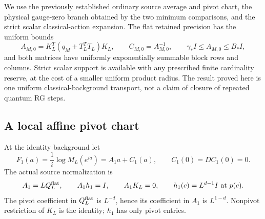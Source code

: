 \documentclass[11pt]{article}
\theoremstyle{remark}
\begin{document}
We use the previously established ordinary source average and pivot
chart, the physical gauge-zero branch obtained by the two minimum
comparisons, and the strict scalar classical-action expansion. The flat
retained precision has the uniform bounds
\begin{equation}
 A_{M,0}=K_L^T(q_M+T_L^TT_L)K_L,\qquad C_{M,0}=A_{M,0}^{-1},
 \qquad \gamma_*I\le A_{M,0}\le B_*I,                         \label{st-flat-precision}
\end{equation}
and both matrices have uniformly exponentially summable block rows and
columns. Strict scalar support is available with any prescribed finite
cardinality reserve, at the cost of a smaller uniform product radius.
The result proved here is one uniform classical-background transport,
not a claim of closure of repeated quantum RG steps.

\subsection{A local affine pivot chart}
\label{st-affine-section}

At the identity background let
\begin{equation}
 F_1(a)=\frac1i\log M_L(e^{ia})=A_1a+C_1(a),\qquad
 C_1(0)=DC_1(0)=0.                                           \label{st-constraint}
\end{equation}
The actual source normalization is
\begin{equation}
 A_1=LQ_L^{\rm flat},\qquad A_1h_1=I,\qquad A_1K_L=0,
 \qquad h_1(c)=L^{d-1}I\text{ at }p(c).                       \label{st-pivot-normalization}
\end{equation}
The pivot coefficient in $Q_L^{\rm flat}$ is $L^{-d}$, hence its
coefficient in $A_1$ is $L^{1-d}$. Nonpivot restriction of $K_L$ is the
identity; $h_1$ has only pivot entries.
\end{document}
